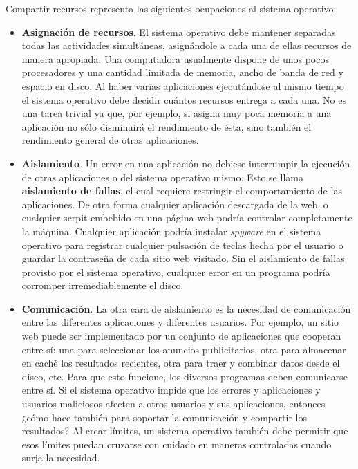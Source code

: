 \documentclass[10pt]{book}
\begin{document}
Compartir recursos representa las siguientes ocupaciones al sistema operativo:
\begin{itemize}
\item \textbf{Asignación de recursos}. El sistema operativo debe mantener separadas todas las actividades simultáneas, asignándole a cada una de ellas recursos de manera apropiada. Una computadora usualmente dispone de unos pocos procesadores y una cantidad limitada de memoria, ancho de banda de red y espacio en disco. Al haber varias aplicaciones ejecutándose al mismo tiempo el sistema operativo debe decidir cuántos recursos entrega a cada una. No es una tarea trivial ya que, por ejemplo, si asigna muy poca memoria a una aplicación no sólo disminuirá el rendimiento de ésta, sino también el rendimiento general de otras aplicaciones.

\item \textbf{Aislamiento}. Un error en una aplicación no debiese interrumpir la ejecución de otras aplicaciones o del sistema operativo mismo. Esto se llama \textbf{aislamiento de fallas}, el cual requiere restringir el comportamiento de las aplicaciones. De otra forma cualquier aplicación descargada de la web, o cualquier scrpit embebido en una página web podría controlar completamente la máquina. Cualquier aplicación podría instalar \textit{spyware} en el sistema operativo para registrar cualquier pulsación de teclas hecha por el usuario o guardar la contraseña de cada sitio web visitado. Sin el aislamiento de fallas provisto por el sistema operativo, cualquier error en un programa podría corromper irremediablemente el disco.

\item \textbf{Comunicación}. La otra cara de aislamiento es la necesidad de comunicación entre las diferentes aplicaciones y diferentes usuarios. Por ejemplo, un sitio web puede ser implementado por un conjunto de aplicaciones que cooperan entre sí: una para seleccionar los anuncios publicitarios, otra para almacenar en caché los resultados recientes, otra para traer y combinar datos desde el disco, etc. Para que esto funcione, los diversos programas deben comunicarse entre sí. Si el sistema operativo impide que los errores y aplicaciones y usuarios maliciosos afecten a otros usuarios y sus aplicaciones, entonces ¿cómo hace también para soportar la comunicación y compartir los resultados? Al crear límites, un sistema operativo también debe permitir que esos límites puedan cruzarse con cuidado en maneras controladas cuando surja la necesidad.
\end{itemize}
\end{document}

